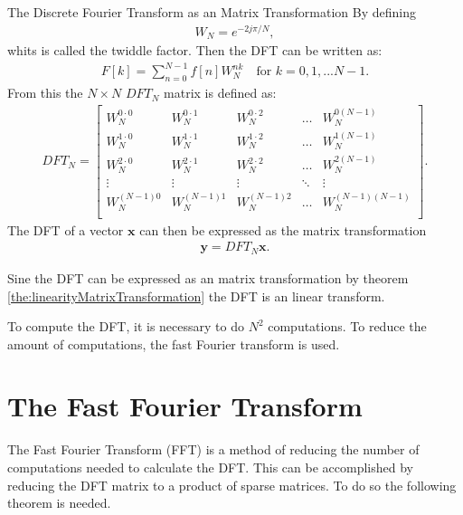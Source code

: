 \begin{theorem}{The Discrete Fourier Transform as an Matrix Transformation}
    By defining
    \begin{align*}
        W_N=e^{-2j\pi/N},
    \end{align*}
    whits is called the twiddle factor. Then the DFT can be written as:
    \begin{align*}
        F[k]=\sum^{N-1}_{n=0}f[n]W_N^{nk}\quad \text{for } k=0, 1,...  N-1.
    \end{align*}
    From this the $N\times N$ $DFT_N$ matrix is defined as:
    \begin{align*}
        DFT_N=
        \begin{bmatrix}
             W_N^{0\cdot0} & W_N^{0\cdot1} & W_N^{0\cdot2} & \hdots & W_N^{0(N-1)} \\
             W_N^{1\cdot0} & W_N^{1\cdot1} & W_N^{1\cdot2} & \hdots & W_N^{1(N-1)} \\
             W_N^{2\cdot 0} & W_N^{2\cdot1} & W_N^{2\cdot2} & \hdots & W_N^{2(N-1)} \\
             \vdots & \vdots & \vdots & \ddots & \vdots \\
             W_N^{(N-1)0} & W_N^{(N-1)1} & W_N^{(N-1)2} & \hdots & W_N^{(N-1)(N-1)} \\
         \end{bmatrix}.
    \end{align*}
    The DFT of a vector $\textbf{x}$ can then be expressed as the matrix transformation
    \begin{align*}
        \textbf{y}=DFT_N\textbf{x}.
    \end{align*}
    \cite[10]{rao2011fast}
\end{theorem}
Sine the DFT can be expressed as an matrix transformation by theorem \ref{the:linearityMatrixTransformation} the DFT is an linear transform.

To compute the DFT, it is necessary to do $N^2$ computations. To reduce the amount of computations, the fast Fourier transform is used.

\section{The Fast Fourier Transform}
The Fast Fourier Transform (FFT) is a method of reducing the number of computations needed to calculate the DFT. This can be accomplished by reducing the DFT matrix to a product of sparse matrices. 
To do so the following theorem is needed.


